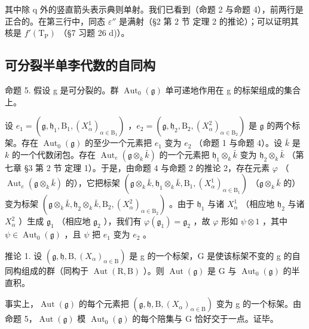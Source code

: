 其中除 q 外的竖直箭头表示典则单射。我们已看到（命题 2 与命题 4），前两行是正合的。在第三行中，同态 \(\varepsilon''\) 是满射（§2 第 2 节 定理 2 的推论）；可以证明其核是 \(f'(\mathrm{T}_{\mathrm{P}})\) （§7 习题 26 d)）。

\subsection{可分裂半单李代数的自同构}

命题 5. 假设 g 是可分裂的。群 \(\operatorname{Aut}_{0}(\mathfrak{g})\) 单可递地作用在 g 的标架组成的集合上。

设 \(e_1 = (\mathfrak{g}, \mathfrak{h}_1, \mathrm{B}_1, (X_\alpha^1)_{\alpha \in \mathrm{B}_1})\) ，\(e_2 = (\mathfrak{g}, \mathfrak{h}_2, \mathrm{B}_2, (X_\alpha^2)_{\alpha \in \mathrm{B}_2})\) 是 \(\mathfrak{g}\) 的两个标架。存在 \(\operatorname{Aut}_0(\mathfrak{g})\) 的至少一个元素把 \(e_1\) 变为 \(e_2\) （命题 1 与命题 4）。设 \(\bar{k}\) 是 \(k\) 的一个代数闭包。存在 \(\operatorname{Aut}_e(\mathfrak{g} \otimes_k \bar{k})\) 的一个元素把 \(\mathfrak{h}_1 \otimes_k \bar{k}\) 变为 \(\mathfrak{h}_2 \otimes_k \bar{k}\) （第七章 §3 第 2 节 定理 1）。于是，由命题 4 与命题 2 的推论 2，存在元素 \(\varphi\) （\(\operatorname{Aut}_e(\mathfrak{g} \otimes_k \bar{k})\) 的），它把标架 \((\mathfrak{g} \otimes_k \bar{k}, \mathfrak{h}_1 \otimes_k \bar{k}, \mathrm{B}_1, (X_\alpha^1)_{\alpha \in \mathrm{B}_1})\) （\(\mathfrak{g} \otimes_k \bar{k}\) 的）变为标架 \((\mathfrak{g} \otimes_k \bar{k}, \mathfrak{h}_2 \otimes_k \bar{k}, \mathrm{B}_2, (X_\alpha^2)_{\alpha \in \mathrm{B}_2})\) 。由于 \(\mathfrak{h}_1\) 与诸 \(X_\alpha^1\) （相应地 \(\mathfrak{h}_2\) 与诸 \(X_\alpha^2\) ）生成 \(\mathfrak{g}_1\) （相应地 \(\mathfrak{g}_2\) ），我们有 \(\varphi(\mathfrak{g}_1) = \mathfrak{g}_2\) ，故 \(\varphi\) 形如 \(\psi \otimes 1\) ，其中 \(\psi \in \operatorname{Aut}_0(\mathfrak{g})\) ，且 \(\psi\) 把 \(e_1\) 变为 \(e_2\) 。

推论 1. 设 \((\mathfrak{g},\mathfrak{h},\mathrm{B},(X_{\alpha})_{\alpha\in\mathrm{B}})\) 是 g 的一个标架，G 是使该标架不变的 g 的自同构组成的群（同构于 \(\operatorname{Aut}(\mathrm{R},\mathrm{B})\) ）。则 \(\operatorname{Aut}(\mathfrak{g})\) 是 G 与 \(\operatorname{Aut}_{0}(\mathfrak{g})\) 的半直积。

事实上，\(\operatorname{Aut}(\mathfrak{g})\) 的每个元素把 \((\mathfrak{g},\mathfrak{h},\mathrm{B},(X_{\alpha})_{\alpha\in\mathrm{B}})\) 变为 g 的一个标架。由命题 5，\(\operatorname{Aut}(\mathfrak{g})\) 模 \(\operatorname{Aut}_{0}(\mathfrak{g})\) 的每个陪集与 G 恰好交于一点。证毕。

